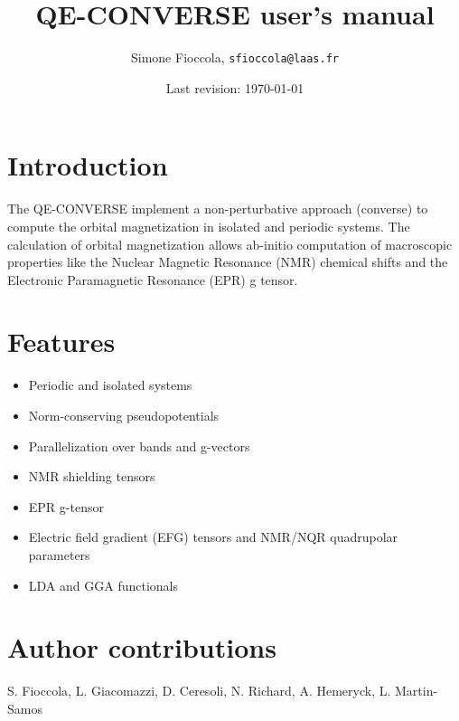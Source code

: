 \documentclass[a4paper,11pt,twoside]{article}
\title{QE-CONVERSE user's manual}
\author{Simone Fioccola, \texttt{sfioccola@laas.fr}}
\date{Last revision: \today}
\begin{document}
\maketitle
\thispagestyle{empty}

\section{Introduction}
The QE-CONVERSE implement a non-perturbative approach (converse) to compute the orbital magnetization in isolated and periodic systems. The calculation of orbital magnetization allows ab-initio computation of macroscopic properties like the Nuclear Magnetic Resonance (NMR) chemical shifts and the Electronic Paramagnetic Resonance (EPR) g tensor.

\section{Features}
\begin{itemize}
  \item Periodic and isolated systems
  \item Norm-conserving pseudopotentials
  \item Parallelization over bands and g-vectors
  \item NMR shielding tensors
  \item EPR g-tensor
  \item Electric field gradient (EFG) tensors and NMR/NQR quadrupolar parameters
  \item LDA and GGA functionals
\end{itemize}

\section{Author contributions}
{
  S. Fioccola, L. Giacomazzi, D. Ceresoli, N. Richard, A. Hemeryck, L. Martin-Samos
} 
\end{document}
